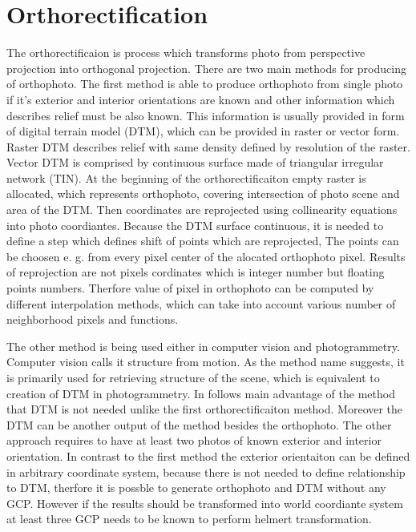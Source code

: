 \documentclass[a4paper,12pt]{report}
\begin{document}
\section{Orthorectification}

The orthorectificaion is process which transforms photo from perspective projection into orthogonal projection. 
\label{sec:single_ortho}
There are two main methods for producing of orthophoto. The first method is able to produce orthophoto 
from single photo if it's exterior and interior orientations are known and other information which describes
relief must be also known. This information is usually provided in form of digital terrain model (DTM), which 
can be provided in raster or vector form. Raster DTM describes relief with same density defined by resolution of the raster.
Vector DTM is comprised by continuous surface made of triangular irregular network (TIN). 
At the beginning of the orthorectificaiton empty raster is allocated, which represents orthophoto, 
covering intersection of photo scene and area of the DTM. Then coordinates are reprojected using collinearity
equations into photo coordiantes. Because the DTM surface continuous, it is needed to define 
a step which defines shift of points which are reprojected, The points can be choosen e. g. from every pixel center
of the alocated orthophoto pixel. Results of reprojection are not pixels cordinates which is integer number but 
floating points numbers. Therfore value of pixel in orthophoto can be computed by different interpolation methods,
which can take into account various number of neighborhood pixels and functions.

The other method is being used either in computer vision and photogrammetry.
Computer vision calls it structure from motion. As the method name suggests, it is primarily used for retrieving
structure of the scene, which is equivalent to creation of DTM in photogrammetry. In follows main advantage 
of the method that DTM is not needed unlike the first orthorectificaiton method. Moreover 
the DTM can be another output of the method besides the orthophoto.  The other approach requires to have at least
two photos of known exterior and interior orientation. In contrast to the first method the exterior orientaiton
can be defined in arbitrary coordinate system, because there is not needed to define relationship to DTM, 
therfore it is possble to generate orthophoto and DTM without any GCP. However 
if the results should be transformed into world coordiante system at least three GCP needs to be known
to perform helmert transformation. 
\end{document}
